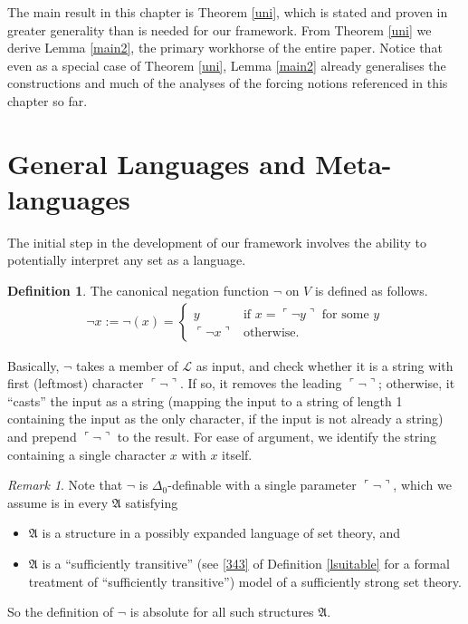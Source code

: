 \documentclass[12pt, twoside]{memoir}
\numberwithin{equation}{section}
\theoremstyle{definition}
\newtheorem{defi}[thm]{Definition}
\theoremstyle{remark}
\newtheorem{rem}[thm]{Remark}
\theoremstyle{definition}
\theoremstyle{definition}
\theoremstyle{definition}
\theoremstyle{remark}
\begin{document}
The main result in this chapter is Theorem \ref{uni}, which is stated and proven in greater generality than is needed for our framework. From Theorem \ref{uni} we derive Lemma \ref{main2}, the primary workhorse of the entire paper. Notice that even as a special case of Theorem \ref{uni}, Lemma \ref{main2} already generalises the constructions and much of the analyses of the forcing notions referenced in this chapter so far.

\section{General Languages and Meta-languages}

The initial step in the development of our framework involves the ability to potentially interpret any set as a language. 

\begin{defi}\label{neg}
The canonical negation function $\neg$ on $V$ is defined as follows. 
\begin{align*}
    \neg x := \neg(x) = 
    \begin{cases}
        y & \text{if } x = \ulcorner \neg y \urcorner \text{ for some } y \\
        \ulcorner \neg x \urcorner & \text{otherwise}.
    \end{cases}
\end{align*}
\end{defi}

Basically, $\neg$ takes a member of $\mathcal{L}$ as input, and check whether it is a string with first (leftmost) character $\ulcorner \neg \urcorner$. If so, it removes the leading $\ulcorner \neg \urcorner$; otherwise, it ``casts'' the input as a string (mapping the input to a string of length 1 containing the input as the only character, if the input is not already a string) and prepend $\ulcorner \neg \urcorner$ to the result. For ease of argument, we identify the string containing a single character $x$ with $x$ itself. 

\begin{rem}\label{rem32}
Note that $\neg$ is $\Delta_0$-definable with a single parameter $\ulcorner \neg \urcorner$, which we assume is in every $\mathfrak{A}$ satisfying
\begin{itemize}
    \item $\mathfrak{A}$ is a structure in a possibly expanded language of set theory, and
    \item $\mathfrak{A}$ is a ``sufficiently transitive'' (see \ref{343} of Definition \ref{lsuitable} for a formal treatment of ``sufficiently transitive'') model of a sufficiently strong set theory.
\end{itemize} 
So the definition of $\neg$ is absolute for all such structures $\mathfrak{A}$.
\end{rem}
\end{document}
